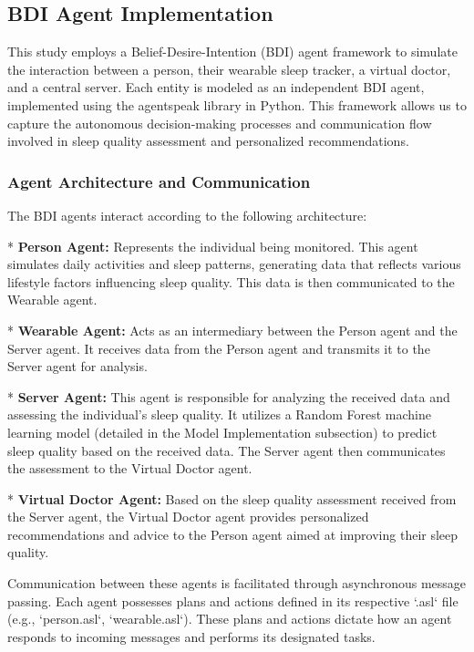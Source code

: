 \documentclass[conference]{IEEEtran}
\begin{document}
\subsection{BDI Agent Implementation} 

This study employs a Belief-Desire-Intention (BDI) agent framework to simulate the interaction between a person, their wearable sleep tracker, a virtual doctor, and a central server. Each entity is modeled as an independent BDI agent, implemented using the agentspeak library in Python. This framework allows us to capture the autonomous decision-making processes and communication flow involved in sleep quality assessment and personalized recommendations.

\subsubsection{Agent Architecture and Communication}

The BDI agents interact according to the following architecture:

* \textbf{Person Agent:} Represents the individual being monitored. This agent simulates daily activities and sleep patterns, generating data that reflects various lifestyle factors influencing sleep quality. This data is then communicated to the Wearable agent.

* \textbf{Wearable Agent:} Acts as an intermediary between the Person agent and the Server agent. It receives data from the Person agent and transmits it to the Server agent for analysis.

* \textbf{Server Agent:}  This agent is responsible for analyzing the received data and assessing the individual's sleep quality. It utilizes a Random Forest machine learning model (detailed in the Model Implementation subsection) to predict sleep quality based on the received data.  The Server agent then communicates the assessment to the Virtual Doctor agent.

* \textbf{Virtual Doctor Agent:}  Based on the sleep quality assessment received from the Server agent, the Virtual Doctor agent provides personalized recommendations and advice to the Person agent aimed at improving their sleep quality.

Communication between these agents is facilitated through asynchronous message passing. Each agent possesses plans and actions defined in its respective `.asl` file (e.g., `person.asl`, `wearable.asl`). These plans and actions dictate how an agent responds to incoming messages and performs its designated tasks.
\end{document}
